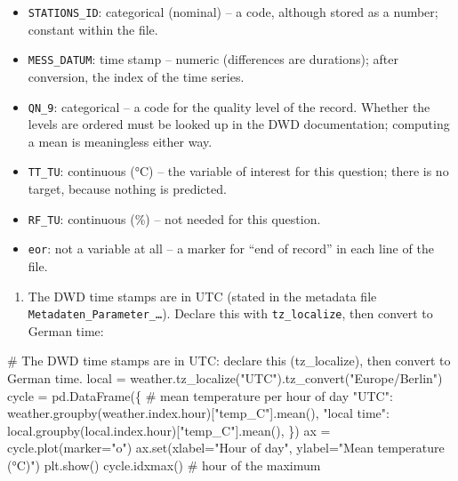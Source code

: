 \documentclass[
  letterpaper,
  DIV=11,
  numbers=noendperiod]{scrreprt}
\newenvironment{Shaded}{\begin{snugshade}}{\end{snugshade}}
\newcommand{\BuiltInTok}[1]{\textcolor[rgb]{0.00,0.23,0.31}{#1}}
\newcommand{\CommentTok}[1]{\textcolor[rgb]{0.37,0.37,0.37}{#1}}
\newcommand{\NormalTok}[1]{\textcolor[rgb]{0.00,0.23,0.31}{#1}}
\newcommand{\OperatorTok}[1]{\textcolor[rgb]{0.37,0.37,0.37}{#1}}
\newcommand{\StringTok}[1]{\textcolor[rgb]{0.13,0.47,0.30}{#1}}
\providecommand{\tightlist}{%
  \setlength{\itemsep}{0pt}\setlength{\parskip}{0pt}}\usepackage{longtable,booktabs,array}
\begin{document}
\begin{tcolorbox}
\begin{itemize}
\tightlist
\item
  \texttt{STATIONS\_ID}: categorical (nominal) -- a code, although
  stored as a number; constant within the file.
\item
  \texttt{MESS\_DATUM}: time stamp -- numeric (differences are
  durations); after conversion, the index of the time series.
\item
  \texttt{QN\_9}: categorical -- a code for the quality level of the
  record. Whether the levels are ordered must be looked up in the DWD
  documentation; computing a mean is meaningless either way.
\item
  \texttt{TT\_TU}: continuous (°C) -- the variable of interest for this
  question; there is no target, because nothing is predicted.
\item
  \texttt{RF\_TU}: continuous (\%) -- not needed for this question.
\item
  \texttt{eor}: not a variable at all -- a marker for ``end of record''
  in each line of the file.
\end{itemize}

\begin{enumerate}
\def\labelenumi{(\alph{enumi})}
\setcounter{enumi}{2}
\tightlist
\item
  The DWD time stamps are in UTC (stated in the metadata file
  \texttt{Metadaten\_Parameter\_…}). Declare this with
  \texttt{tz\_localize}, then convert to German time:
\end{enumerate}

\begin{Shaded}
\begin{Highlighting}[]
\CommentTok{\# The DWD time stamps are in UTC: declare this (tz\_localize), then convert to German time.}
\NormalTok{local }\OperatorTok{=}\NormalTok{ weather.tz\_localize(}\StringTok{"UTC"}\NormalTok{).tz\_convert(}\StringTok{"Europe/Berlin"}\NormalTok{)}
\NormalTok{cycle }\OperatorTok{=}\NormalTok{ pd.DataFrame(\{                                    }\CommentTok{\# mean temperature per hour of day}
    \StringTok{"UTC"}\NormalTok{: weather.groupby(weather.index.hour)[}\StringTok{"temp\_C"}\NormalTok{].mean(),}
    \StringTok{"local time"}\NormalTok{: local.groupby(local.index.hour)[}\StringTok{"temp\_C"}\NormalTok{].mean(),}
\NormalTok{\})}
\NormalTok{ax }\OperatorTok{=}\NormalTok{ cycle.plot(marker}\OperatorTok{=}\StringTok{"o"}\NormalTok{)}
\NormalTok{ax.}\BuiltInTok{set}\NormalTok{(xlabel}\OperatorTok{=}\StringTok{"Hour of day"}\NormalTok{, ylabel}\OperatorTok{=}\StringTok{"Mean temperature (°C)"}\NormalTok{)}
\NormalTok{plt.show()}
\NormalTok{cycle.idxmax()                                            }\CommentTok{\# hour of the maximum}
\end{Highlighting}
\end{Shaded}


\end{tcolorbox}
\end{document}
